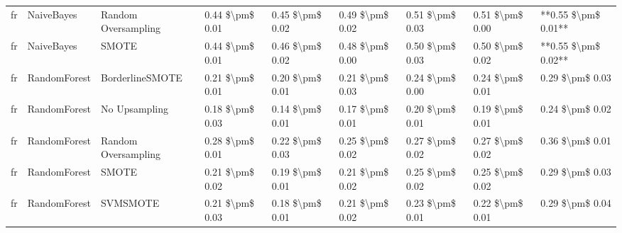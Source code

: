 \begin{tabular}{lllllllll}
      fr &                      NaiveBayes &           Random Oversampling & 0.44 \$\textbackslash pm\$ 0.01 &           0.45 \$\textbackslash pm\$ 0.02 &       0.49 \$\textbackslash pm\$ 0.02 &        0.51 \$\textbackslash pm\$ 0.03 &                         0.51 \$\textbackslash pm\$ 0.00 & **0.55 \$\textbackslash pm\$ 0.01** \\
      fr &                      NaiveBayes &                         SMOTE & 0.44 \$\textbackslash pm\$ 0.01 &           0.46 \$\textbackslash pm\$ 0.02 &       0.48 \$\textbackslash pm\$ 0.00 &        0.50 \$\textbackslash pm\$ 0.03 &                         0.50 \$\textbackslash pm\$ 0.02 & **0.55 \$\textbackslash pm\$ 0.02** \\
      fr &                    RandomForest &               BorderlineSMOTE & 0.21 \$\textbackslash pm\$ 0.01 &           0.20 \$\textbackslash pm\$ 0.01 &       0.21 \$\textbackslash pm\$ 0.03 &        0.24 \$\textbackslash pm\$ 0.00 &                         0.24 \$\textbackslash pm\$ 0.01 &     0.29 \$\textbackslash pm\$ 0.03 \\
      fr &                    RandomForest &                 No Upsampling & 0.18 \$\textbackslash pm\$ 0.03 &           0.14 \$\textbackslash pm\$ 0.01 &       0.17 \$\textbackslash pm\$ 0.01 &        0.20 \$\textbackslash pm\$ 0.01 &                         0.19 \$\textbackslash pm\$ 0.01 &     0.24 \$\textbackslash pm\$ 0.02 \\
      fr &                    RandomForest &           Random Oversampling & 0.28 \$\textbackslash pm\$ 0.01 &           0.22 \$\textbackslash pm\$ 0.03 &       0.25 \$\textbackslash pm\$ 0.02 &        0.27 \$\textbackslash pm\$ 0.02 &                         0.27 \$\textbackslash pm\$ 0.02 &     0.36 \$\textbackslash pm\$ 0.01 \\
      fr &                    RandomForest &                         SMOTE & 0.21 \$\textbackslash pm\$ 0.02 &           0.19 \$\textbackslash pm\$ 0.01 &       0.21 \$\textbackslash pm\$ 0.02 &        0.25 \$\textbackslash pm\$ 0.02 &                         0.25 \$\textbackslash pm\$ 0.02 &     0.29 \$\textbackslash pm\$ 0.03 \\
      fr &                    RandomForest &                      SVMSMOTE & 0.21 \$\textbackslash pm\$ 0.03 &           0.18 \$\textbackslash pm\$ 0.01 &       0.21 \$\textbackslash pm\$ 0.02 &        0.23 \$\textbackslash pm\$ 0.01 &                         0.22 \$\textbackslash pm\$ 0.01 &     0.29 \$\textbackslash pm\$ 0.04 \\

\end{tabular}
